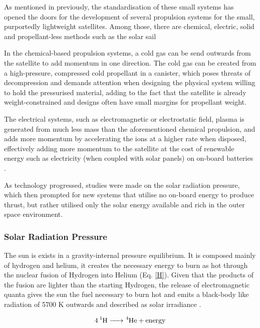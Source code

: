 As mentioned in previously, the standardisation of these small systems has opened the doors for the development of several propulsion systems for the small, purportedly lightweight satellites. Among those, there are chemical, electric, solid and propellant-less methods such as the solar sail 

In the chemical-based propulsion systems, a cold gas can be send outwards from the satellite to add momentum in one direction. The cold gas can be created from a high-pressure, compressed cold propellant in a canister, which poses threats of decompression and demands attention when designing the physical system willing to hold the pressurised material, adding to the fact that the satellite is already weight-constrained and designs often have small margins for propellant weight.

The electrical systems, such as electromagnetic or electrostatic field, plasma is generated from much less mass than the aforementioned chemical propulsion, and adds more momentum by accelerating the ions at a higher rate when disposed, effectively adding more momentum to the satellite at the cost of renewable energy such as electricity (when coupled with solar panels) on on-board batteries \cite{propulsion}.

As technology progressed, studies were made on the solar radiation pressure, which then prompted for new systems that utilise no on-board energy to produce thrust, but rather utilised only the solar energy available and rich in the outer space environment.

\subsubsection{Solar Radiation Pressure}\label{background:srp}


The sun is exists in a gravity-internal pressure equilibrium. It is composed mainly of hydrogen and helium, it creates the necessary energy to burn as hot through the nuclear fusion of Hydrogen into Helium (Eq. \ref{H}). Given that the products of the fusion are lighter than the starting Hydrogen, the release of electromagnetic quanta gives the sun the fuel necessary to burn hot and emits a black-body like radiation of 5700 K outwards and described as solar irradiance \cite{sunpower}.

\begin{equation}
\ce{4 ^{1}H -> ^{4}He + energy}
\label{H}
\end{equation}

